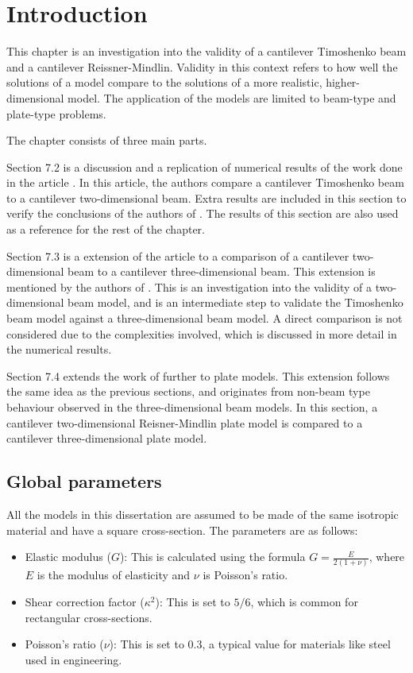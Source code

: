 \documentclass[../../main.tex]{subfiles}
\begin{document}
\section{Introduction}
This chapter is an investigation into the validity of a cantilever Timoshenko beam and a cantilever Reissner-Mindlin. Validity in this context refers to how well the solutions of a model compare to the solutions of a more realistic, higher-dimensional model. The application of the models are limited to beam-type and plate-type problems.

The chapter consists of three main parts.

Section 7.2 is a discussion and a replication of numerical results of the work done in the article \cite{LVV09}. In this article, the authors compare a cantilever Timoshenko beam to a cantilever two-dimensional beam. Extra results are included in this section to verify the conclusions of the authors of \cite{LVV09}. The results of this section are also used as a reference for the rest of the chapter.

Section 7.3 is a extension of the article \cite{LVV09} to a comparison of a cantilever two-dimensional beam to a cantilever three-dimensional beam. This extension is mentioned by the authors of \cite{LVV09}. This is an investigation into the validity of a two-dimensional beam model, and is an intermediate step to validate the Timoshenko beam model against a three-dimensional beam model. A direct comparison is not considered due to the complexities involved, which is discussed in more detail in the numerical results.

Section 7.4 extends the work of \cite{LVV09} further to plate models. This extension follows the same idea as the previous sections, and originates from non-beam type behaviour observed in the three-dimensional beam models. In this section, a cantilever two-dimensional Reisner-Mindlin plate model is compared to a cantilever three-dimensional plate model.


\subsection{Global parameters}
All the models in this dissertation are assumed to be made of the same isotropic material and have a square cross-section. The parameters are as follows:

\begin{itemize}
    \item Elastic modulus ($G$): This is calculated using the formula $G = \frac{E}{2(1+\nu)}$, where $E$ is the modulus of elasticity and $\nu$ is Poisson's ratio. 

    \item Shear correction factor ($\kappa^2$): This is set to $5/6$, which is common for rectangular cross-sections.

    \item Poisson's ratio ($\nu$): This is set to $0.3$, a typical value for materials like steel used in engineering.
\end{itemize}
\end{document}
